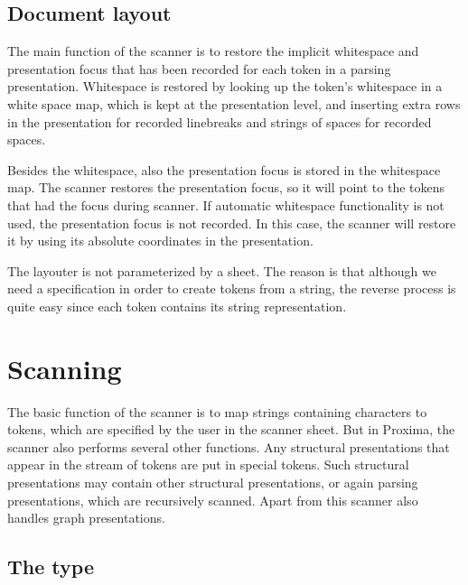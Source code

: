 \documentclass[12pt]{article}
\begin{document}
\subsection{Document layout}

The main function of the scanner is to restore the implicit whitespace and presentation focus that has been recorded for each token in a parsing presentation. Whitespace is restored by looking up the token's whitespace in a white space map, which is kept at the presentation level, and inserting extra rows in the presentation for recorded linebreaks and strings of spaces for recorded spaces. 

Besides the whitespace, also the presentation focus is stored in the whitespace map. The scanner restores the presentation focus, so it will point to the tokens that had the focus during scanner. If automatic whitespace functionality is not used, the presentation focus is not recorded. In this case, the scanner will restore it by using its absolute coordinates in the presentation.

The layouter is not parameterized by a sheet. The reason is that although we need a specification in order to create tokens from a string, the reverse process is quite easy since each token contains its string representation.  





%
\section{Scanning}\label{sect:scanner}
%

The basic function of the scanner is to map strings containing characters to tokens, which are specified by the user in the scanner sheet. But in Proxima, the scanner also performs several other functions. Any structural presentations that appear in the stream of tokens are put in special tokens. Such structural presentations may contain other structural presentations, or again parsing presentations, which are recursively scanned. Apart from this scanner also handles graph presentations. 



\subsection{The  type}
\end{document}
